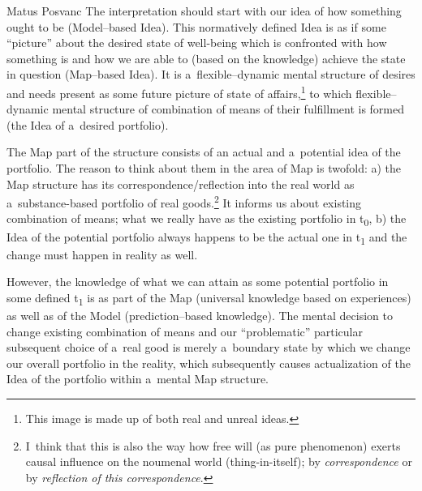 \begin{artengenv}{Matus Posvanc}
The interpretation should start with our idea of how something ought to be (Model–based Idea). This normatively defined Idea is as if some ``picture'' about the desired state of well-being which is confronted with how something is and how we are able to (based on the knowledge) achieve the state in question (Map–based Idea). It is a~flexible–dynamic mental structure of desires and needs present as some future picture of state of affairs,\footnote{This image is made up of both real and unreal ideas.} to which flexible–dynamic mental structure of combination of means of their fulfillment is formed (the Idea of a~desired portfolio).



The Map part of the structure consists of an actual and a~potential idea of the portfolio. The reason to think about them in the area of Map is twofold: a) the Map structure has its correspondence/reflection into the real world as a~substance-based portfolio of real goods.\footnote{I~think that this is also the way how free will (as pure phenomenon) exerts causal influence on the noumenal world (thing-in-itself); by \textit{correspondence} or by \textit{reflection of this correspondence}.} It informs us about existing combination of means; what we really have as the existing portfolio in t\textsubscript{0}, b) the Idea of the potential portfolio always happens to be the actual one in t\textsubscript{1} and the change must happen in reality as well.



However, the knowledge of what we can attain as some potential portfolio in some defined t\textsubscript{1 }is as part of the Map (universal knowledge based on experiences) as well as of the Model (prediction–based knowledge). The mental decision to change existing combination of means and our ``problematic'' particular subsequent choice of a~real good is merely a~boundary state by which we change our overall portfolio in the reality, which subsequently causes actualization of the Idea of the portfolio within a~mental Map structure.




\end{artengenv}
